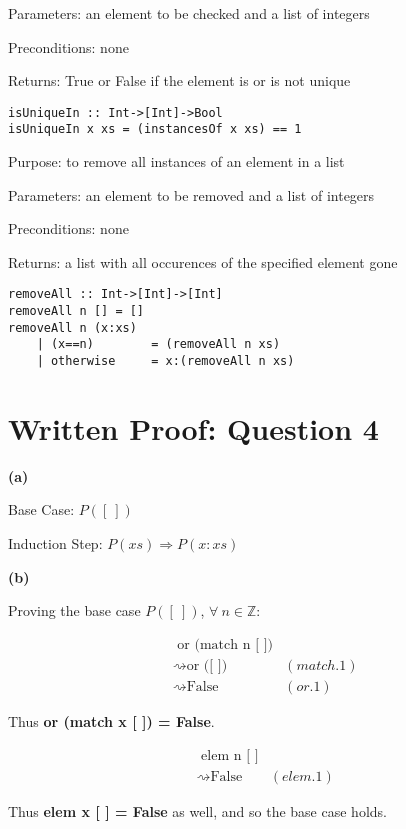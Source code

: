 \documentclass{article}
\begin{document}
Parameters: an element to be checked and a list of integers

Preconditions: none

Returns: True or False if the element is or is not unique

\begin{lstlisting}
isUniqueIn :: Int->[Int]->Bool
isUniqueIn x xs = (instancesOf x xs) == 1
\end{lstlisting}
    
\newpage

Purpose: to remove all instances of an element in a list

Parameters: an element to be removed and a list of integers

Preconditions: none

Returns: a list with all occurences of the specified element gone

\begin{lstlisting}
removeAll :: Int->[Int]->[Int]
removeAll n [] = []
removeAll n (x:xs)
    | (x==n)		= (removeAll n xs)
    | otherwise		= x:(removeAll n xs)
\end{lstlisting}

\section{Written Proof: Question 4}

\textbf{(a)}

Base Case: $P([\:])$

Induction Step: $P(xs) \Rightarrow P(x:xs)$

\textbf{(b)}

Proving the base case $P([\:])$, $\forall \: n \in \mathbb{Z}$:

\begin{align*}
&\text{ or (match n [ ])} \\
&\rightsquigarrow \text{or ([ ])}			&(match.1) \\
&\rightsquigarrow \text{False}				&(or.1)
\end{align*}

Thus \textbf{or (match x [ ]) = False}.

\begin{align*}
&\text{ elem n [ ]} \\
&\rightsquigarrow \text{False}				&(elem.1)
\end{align*}

Thus \textbf{elem x [ ] = False} as well, and so the base case holds.
\end{document}
